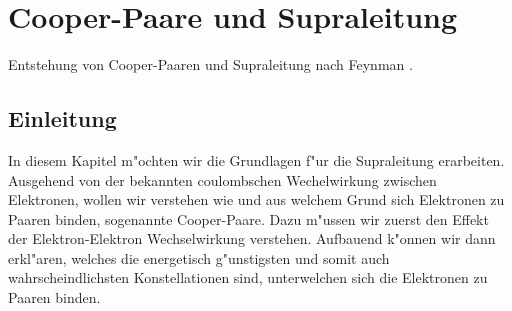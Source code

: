 \chapter{Cooper-Paare und Supraleitung\label{chapter:supraleitung}}
\begin{refsection}


Entstehung von Cooper-Paaren und Supraleitung nach Feynman
\cite{supraleitung:feynman}.


\newpage
\section{Einleitung}
In diesem Kapitel m"ochten wir die Grundlagen f"ur die Supraleitung erarbeiten. Ausgehend von der bekannten coulombschen Wechelwirkung zwischen Elektronen, wollen wir verstehen wie und aus welchem Grund sich Elektronen zu Paaren binden, sogenannte Cooper-Paare. Dazu m"ussen wir zuerst den Effekt der Elektron-Elektron Wechselwirkung verstehen. Aufbauend k"onnen wir dann erkl"aren, welches die energetisch g"unstigsten und somit auch wahrscheindlichsten Konstellationen sind, unterwelchen sich die Elektronen zu Paaren binden.


\end{refsection}
